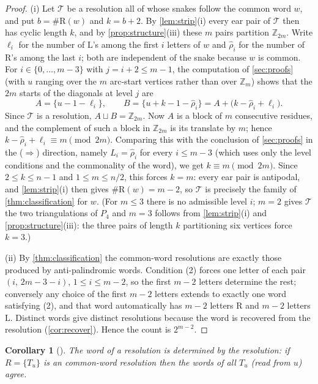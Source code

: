 \documentclass[11pt,a4paper]{article}
\newtheorem{corollary}[theorem]{Corollary}
\theoremstyle{definition}
\theoremstyle{remark}
\newcommand{\Zd}{\ensuremath{\mathbb{Z}}}
\newcommand{\Li}{\mathrm{L}}
\newcommand{\Ri}{\mathrm{R}}
\begin{document}
\begin{proof}
(i) Let $\mathcal{T}$ be a resolution all of whose snakes follow the common word $w$, and put
$b=\#\Ri(w)$ and $k=b+2$.  By \cref{lem:strip}(i) every ear pair of $\mathcal{T}$ then has
cyclic length $k$, and by \cref{prop:structure}(iii) these $m$ pairs partition $\Zd_{2m}$.
Write $\ell_i$ for the number of $\Li$'s among the first $i$ letters of $w$ and
$\widehat\rho_i$ for the number of $\Ri$'s among the last $i$; both are independent of the
snake because $w$ is common.  For $i\in\{0,\dots,m-3\}$ with $j=i+2\le m-1$, the computation
of \cref{sec:proofs} (with $u$ ranging over the $m$ arc-start vertices rather than over
$\Zd_m$) shows that the $2m$ starts of the diagonals at level $j$ are
\[
  A=\{u-1-\ell_i\},\qquad B=\{u+k-1-\widehat\rho_i\}=A+\big(k-\widehat\rho_i+\ell_i\big).
\]
Since $\mathcal{T}$ is a resolution, $A\sqcup B=\Zd_{2m}$.  Now $A$ is a block of $m$
consecutive residues, and the complement of such a block in $\Zd_{2m}$ is its translate by
$m$; hence
$k-\widehat\rho_i+\ell_i\equiv m\pmod{2m}$.  Comparing this with the conclusion of
\cref{sec:proofs} in the ($\Rightarrow$) direction, namely
$L_i=\widehat\rho_i$ for every $i\le m-3$ (which uses only the level conditions and the
commonality of the word), we get $k\equiv m\pmod{2m}$.  Since $2\le k\le n-1$ and
$1\le m\le n/2$, this forces $k=m$: every ear pair is antipodal, and \cref{lem:strip}(i)
then gives $\#\Ri(w)=m-2$, so $\mathcal{T}$ is precisely the family of
\cref{thm:classification} for $w$.
(For $m\le3$ there is no admissible level $i$; $m=2$ gives $\mathcal{T}$ the two
triangulations of $P_4$ and $m=3$ follows from \cref{lem:strip}(i) and
\cref{prop:structure}(iii): the three pairs of length $k$ partitioning six vertices force
$k=3$.)

(ii) By \cref{thm:classification} the common-word resolutions are exactly those produced by
anti-palindromic words.  Condition (2) forces one letter of each pair
$(i,\,2m-3-i)$, $1\le i\le m-2$, so the first $m-2$ letters determine the rest; conversely
any choice of the first $m-2$ letters extends to exactly one word satisfying (2), and that
word automatically has $m-2$ letters $\Ri$ and $m-2$ letters $\Li$.  Distinct words give
distinct resolutions because the word is recovered from the resolution
(\cref{cor:recover}).  Hence the count is $2^{m-2}$.
\end{proof}

\begin{corollary}[\label{cor:recover}]
The word of a resolution is determined by the resolution: if $R=\{T_u\}$ is an
common-word resolution then the words of all $T_u$ (read from $u$) agree.
\end{corollary}
\end{document}
